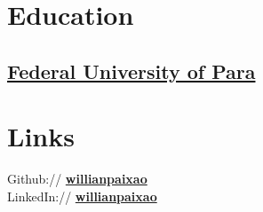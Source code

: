\documentclass[]{willianpaixao-resume}
\begin{document}
\lastupdated



\begin{minipage}[t]{0.35\textwidth} 


\section{Education}

\subsection{\href{http://www.portal.ufpa.br/}{Federal University of Para}}
\sectionsep


\section{Links} 
Github:// \href{https://github.com/willianpaixao}{\bf willianpaixao} \\
LinkedIn://  \href{https://www.linkedin.com/in/willianpaixao}{\bf willianpaixao} \\
\sectionsep



\end{minipage}
\end{document}
